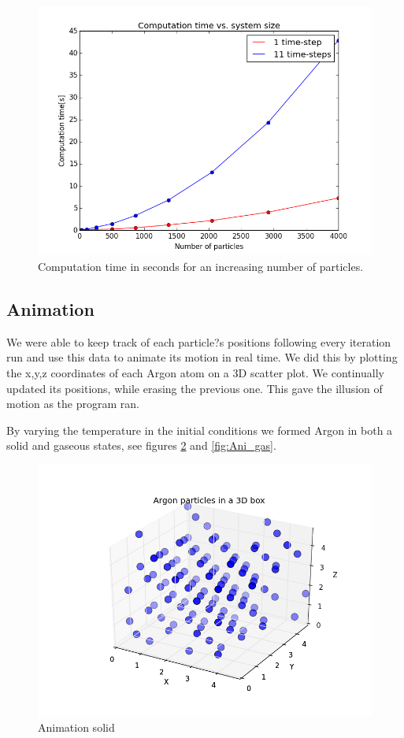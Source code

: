 \documentclass[a4paper,twoside,12pt]{article}
\begin{document}
\begin{figure}
\centering
\includegraphics[scale=0.6]{figures/computationtime_particles}
\caption{Computation time in seconds for an increasing number of particles.}
\label{fig:comp_N}
\end{figure}

\subsection{Animation}

\noindent We were able to keep track of each particle?s positions following every iteration run and use this data to animate its motion in real time. We did this by plotting the x,y,z coordinates of each Argon atom on a 3D scatter plot. We continually updated its positions, while erasing the previous one. This gave the illusion of motion as the program ran. 
\vspace{5mm}

\noindent By varying the temperature in the initial conditions we formed Argon in both a solid and gaseous states, see figures \ref{fig:Ani_solid} and \ref{fig:Ani_gas}.

\begin{figure}
\centering
\includegraphics[scale=0.6]{figures/ani_solid_2e-6.png}
\caption{Animation solid}
\label{fig:Ani_solid}
\end{figure}
\end{document}
